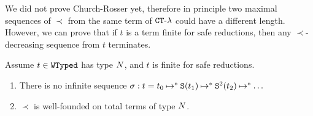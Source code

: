 We did not prove Church-Rosser yet, therefore in principle two maximal
sequences of $\prec$ from the same term of ${ {\tt CT}\mbox{-}\lambda}$ 
could have a different length. However, we can prove that if $t$ is a term finite 
for safe reductions, then any $\prec$-decreasing sequence from $t$ terminates.


\begin{lemma}
\label{lemma-prec-order}
Assume $t \in {\tt WTyped}$ has type ${N}$, and $t$ is finite for safe reductions.

\begin{enumerate}
\item
\label{lemma-prec-order-01}
There is no infinite sequence 
$\sigma: t = t_0 \mathbin{\mapsto}^{*} {\tt S}(t_1) \mathbin{\mapsto}^{*} {\tt S}^2(t_2) \mathbin{\mapsto}^{*} \ldots$

\item
\label{lemma-prec-order-02}
$\prec$ is well-founded on total terms of type ${N}$.
\end{enumerate}
\end{lemma}

%
%


